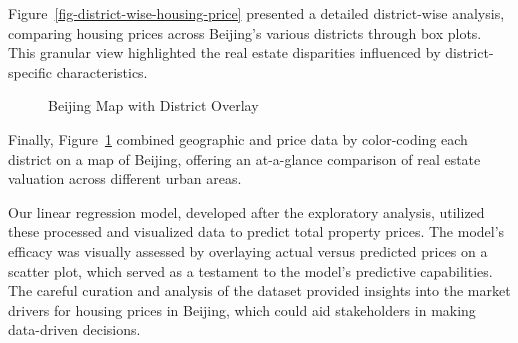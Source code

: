 \documentclass[
  letterpaper,
  DIV=11,
  numbers=noendperiod]{scrartcl}
\begin{document}
Figure~\ref{fig-district-wise-housing-price} presented a detailed
district-wise analysis, comparing housing prices across Beijing's
various districts through box plots. This granular view highlighted the
real estate disparities influenced by district-specific characteristics.

\begin{figure}


\caption{\label{fig-beijing-map-with-district}Beijing Map with District
Overlay}

\end{figure}%

Finally, Figure~\ref{fig-beijing-map-with-district} combined geographic
and price data by color-coding each district on a map of Beijing,
offering an at-a-glance comparison of real estate valuation across
different urban areas.

Our linear regression model, developed after the exploratory analysis,
utilized these processed and visualized data to predict total property
prices. The model's efficacy was visually assessed by overlaying actual
versus predicted prices on a scatter plot, which served as a testament
to the model's predictive capabilities. The careful curation and
analysis of the dataset provided insights into the market drivers for
housing prices in Beijing, which could aid stakeholders in making
data-driven decisions.
\end{document}
